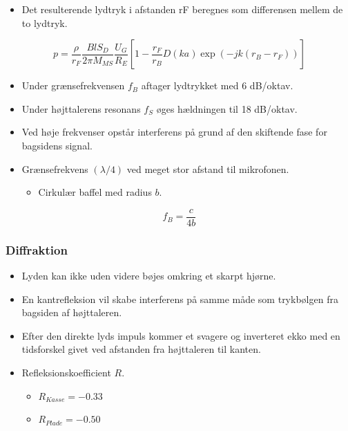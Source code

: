 \begin{itemize}
	\item Det resulterende lydtryk i afstanden rF beregnes som differensen mellem de to lydtryk.
\end{itemize}

\begin{equation}
p = \dfrac{\rho}{r_F}\dfrac{Bl S_D}{2\pi M_{MS}}\dfrac{U_G}{R_E}\left[1-\dfrac{r_F}{r_B}D(ka)\exp(-jk(r_B-r_F))\right]
\end{equation}


\begin{itemize}
	\item Under	grænsefrekvensen $f_B$ aftager lydtrykket med 6 dB/oktav.
	\item Under højttalerens resonans $f_S$ øges hældningen til 18 dB/oktav. \item Ved høje frekvenser opstår interferens på grund af den skiftende
	fase for bagsidens signal.
	\item Grænsefrekvens $(\lambda/4)$ ved meget stor afstand til mikrofonen.
	\begin{itemize}
		\item Cirkulær baffel med radius $b$.
	\end{itemize}
\end{itemize}

\begin{equation}
f_B=\dfrac{c}{4b}
\end{equation}

\subsubsection{Diffraktion}
\begin{itemize}
	\item Lyden kan ikke uden videre bøjes omkring et skarpt hjørne. 
	\item En kantrefleksion vil	skabe interferens på samme måde som trykbølgen fra bagsiden af højttaleren.
	\item Efter den direkte lyds impuls kommer et svagere og inverteret ekko med en tidsforskel givet ved afstanden fra højttaleren til kanten.
	\item Refleksionskoefficient $R$.
	\begin{itemize}
		\item $R_{Kasse} =−0.33$
		\item $R_{Plade} =−0.50$
	\end{itemize}
\end{itemize}

